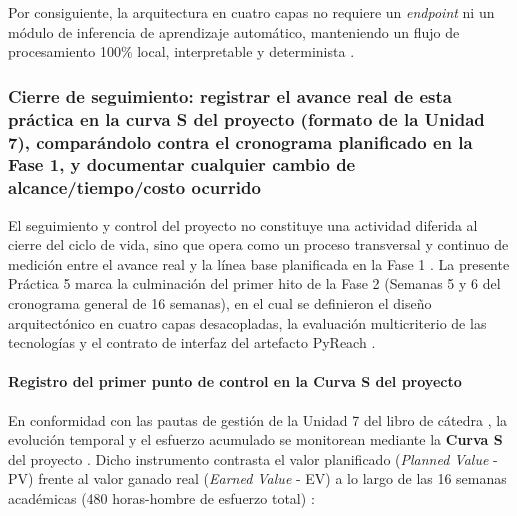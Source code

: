 Por consiguiente, la arquitectura en cuatro capas no requiere un \textit{endpoint} ni un módulo de inferencia de aprendizaje automático, manteniendo un flujo de procesamiento 100\% local, interpretable y determinista \cite{martin2017cleanarch, torres2026proyecto}.

\subsubsection{Cierre de seguimiento: registrar el avance real de esta práctica en la curva S del proyecto (formato de la Unidad 7), comparándolo contra el cronograma planificado en la Fase 1, y documentar cualquier cambio de alcance/tiempo/costo ocurrido}

El seguimiento y control del proyecto no constituye una actividad diferida al cierre del ciclo de vida, sino que opera como un proceso transversal y continuo de medición entre el avance real y la línea base planificada en la Fase 1 \cite{pmi2021pmbok, torres2026proyecto}. La presente Práctica 5 marca la culminación del primer hito de la Fase 2 (Semanas 5 y 6 del cronograma general de 16 semanas), en el cual se definieron el diseño arquitectónico en cuatro capas desacopladas, la evaluación multicriterio de las tecnologías y el contrato de interfaz del artefacto PyReach \cite{pressman2020software, martin2017cleanarch}.

\paragraph*{Registro del primer punto de control en la Curva S del proyecto}
En conformidad con las pautas de gestión de la Unidad 7 del libro de cátedra \cite{torres2026proyecto}, la evolución temporal y el esfuerzo acumulado se monitorean mediante la \textbf{Curva S} del proyecto \cite{pmi2021pmbok}. Dicho instrumento contrasta el valor planificado (\textit{Planned Value} - PV) frente al valor ganado real (\textit{Earned Value} - EV) a lo largo de las 16 semanas académicas (480 horas-hombre de esfuerzo total) \cite{torres2026proyecto}:

